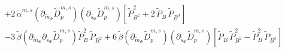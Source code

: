 \begin{align}
      \nonumber \\
                       & + 2\,\tilde \alpha^{m,s} \left( \partial_{\breve m_{\Phi}} \tilde D_p^{m,s} \right)\left( \partial_{\breve s_{\Phi}} \tilde D_p^{m,s} \right)
                         \left[ \tilde P_{B^2}^2 + 2\, \tilde P_B\, \tilde P_{B^3} \right]
      \nonumber \\
                       & - 3\, \tilde \beta \left( \partial_{\breve m_{\Phi}}\partial_{\breve s_{\Phi}} \tilde D_p^{m,s} \right) \tilde P_B^2\,  \tilde P_{B^2}
                         + 6\, \tilde \beta \left( \partial_{\breve m_{\Phi}} \tilde D_p^{m,s} \right)\left( \partial_{\breve s_{\Phi}} \tilde D_p^{m,s} \right)
                         \left[ \tilde P_B\,  \tilde P_{B^2}^2 - \tilde P_B^2\,  \tilde P_{B^3} \right]
\end{align}

